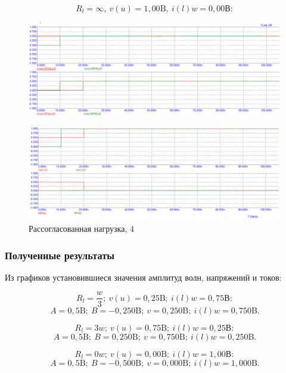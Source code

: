 \documentclass[a4paper, 14pt]{extarticle}%
\begin{document}
\[R_l =\infty,\  v(u)=1,00 \text{B},\ i(l)w =0,00 \text{В} :\]

\begin{figure}[h!]
			\centering
			\includegraphics[width=1.1\linewidth]{./graphs/12.jpg}
			\label{3.4.1}
\end{figure}

\newpage

\begin{figure}[h!]
			\centering
			\includegraphics[width=1.1\linewidth]{./graphs/13.jpg}
			\caption{Рассогласованная нагрузка, 4}
			\label{3.4.2}
\end{figure}

\subsubsection{Полученные результаты}

Из графиков установившиеся значения амплитуд волн, напряжений и токов:

\[R_l =\frac{w}{3};\  v(u)=0,25 \text{B};\ i(l)w =0,75 \text{В} :\]
\[  A = 0,5 \text{B};\ B = -0,250 \text{B};\ v = 0,250 \text{B};\ i(l)w = 0,750 \text{B}.\]

\[R_l =3w;\  v(u)=0,75 \text{B};\ i(l)w =0,25 \text{В} :\]
\[  A = 0,5 \text{B};\ B = 0,250 \text{B};\ v = 0,750 \text{B};\ i(l)w = 0,250 \text{B}.\]

\[R_l =0w;\  v(u)=0,00 \text{B};\ i(l)w =1,00 \text{В} :\]
\[  A = 0,5 \text{B};\ B = -0,500 \text{B};\ v = 0,000 \text{B};\ i(l)w = 1,000 \text{B}.\]
\end{document}
